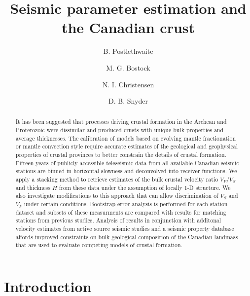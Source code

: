 \documentclass[review]{elsarticle}
\begin{document}
\begin{frontmatter}

\title{Seismic parameter estimation and the Canadian crust}

\author[ubc]{B. Postlethwaite}
\author[ubc]{M. G. Bostock}
\author[ubc]{N. I. Christensen}
\author[gsc]{D. B. Snyder}


\address[ubc]{Earth and Ocean Sciences, UBC, Vancouver BC, Canada}
\address[gsc]{Geological Survey Canada, Natural Resources Canada, Ottawa ON, Canada}
\begin{abstract}
It has been suggested that processes driving crustal formation in the Archean and Proterozoic were dissimilar and produced crusts with unique bulk properties and average thicknesses. The calibration of models based on evolving mantle fractionation or mantle convection style require accurate estimates of the geological and geophysical properties of crustal provinces to better constrain the details of crustal formation. Fifteen years of publicly accessible teleseismic data from all available Canadian seismic stations are binned in horizontal slowness and deconvolved into receiver functions. We apply a stacking method to retrieve estimates of the bulk crustal velocity ratio $V_P/V_S$ and thickness $H$ from these data under the assumption of locally 1-D structure. We also investigate modifications to this approach that can allow discrimination of $V_S$ and $V_P$ under certain conditions. Bootstrap error analysis is performed for each station dataset and subsets of these measurments are compared with results for matching stations from previous studies. Analysis of results in conjunction with additonal velocity estimates from active source seismic studies and a seismic property database affords improved constraints on bulk geological composition of the Canadian landmass that are used to evaluate competing models of crustal formation.
\end{abstract}

\end{frontmatter}
\section{Introduction}
\end{document}
